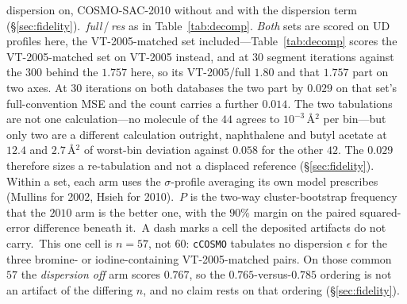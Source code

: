 \begin{table}[t]
{{{dispersion on}, COSMO-SAC-2010 without and with the dispersion term (\S\ref{sec:fidelity}).\quad
{}\,\emph{full}\,/\,\emph{res} as in Table~\ref{tab:decomp}. \emph{Both} sets are scored on UD
profiles here, the VT-2005-matched set included---Table~\ref{tab:decomp} scores the VT-2005-matched set on VT-2005 instead,
and at $30$ segment iterations against the $300$ behind the $1.757$ here, so its VT-2005/full $1.80$
and that $1.757$ part on two axes. At $30$ iterations on both databases the two part by $0.029$ on
that set's full-convention MSE and the count carries a further $0.014$. The two tabulations are not
one calculation---no molecule of the $44$ agrees to $10^{-3}$\,\AA$^2$ per bin---but only two are a
different calculation outright, naphthalene and butyl acetate at $12.4$ and $2.7$\,\AA$^2$ of
worst-bin deviation against $0.058$ for the other $42$. The $0.029$ therefore sizes a re-tabulation
and not a displaced reference (\S\ref{sec:fidelity}). Within a set, each arm uses the $\sigma$-profile averaging its own
model prescribes (Mullins for 2002, Hsieh for 2010).\quad
{}\,$P$ is the two-way cluster-bootstrap frequency that the $2010$ arm is the better one, with
the $90\%$ margin on the paired squared-error difference beneath it.\quad
{}\,A dash marks a cell the deposited artifacts do not carry.\quad
{}\,This one cell is $n{=}57$, not $60$: \texttt{cCOSMO} tabulates no dispersion $\epsilon$ for
the three bromine- or iodine-containing VT-2005-matched pairs. On those common $57$ the \emph{dispersion off}
arm scores $0.767$, so the $0.765$-versus-$0.785$ ordering is not an artifact of the differing $n$,
and no claim rests on that ordering (\S\ref{sec:fidelity}).}}
\end{table}

